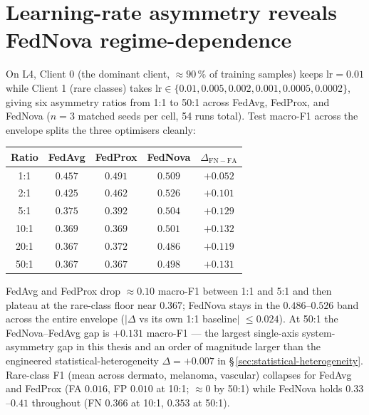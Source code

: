 \documentclass[11pt,a4paper]{report}
\begin{document}


\section{Learning-rate asymmetry reveals FedNova regime-dependence}
\label{sec:lr-asymmetry}

On L4, Client 0 (the dominant client, $\approx 90\,\%$ of training samples)
keeps $\textrm{lr} = 0.01$ while Client 1 (rare classes) takes
$\textrm{lr} \in \{0.01, 0.005, 0.002, 0.001, 0.0005, 0.0002\}$, giving six
asymmetry ratios from 1:1 to 50:1 across FedAvg, FedProx, and FedNova
($n=3$ matched seeds per cell, 54 runs total). Test macro-F1 across the
envelope splits the three optimisers cleanly:

\begin{center}
\begin{tabular}{cccc|c}
\hline
Ratio & FedAvg & FedProx & FedNova & $\Delta_{\mathrm{FN-FA}}$ \\
\hline
 1:1  & $0.457$ & $0.491$ & $\mathbf{0.509}$ & $+0.052$ \\
 2:1  & $0.425$ & $0.462$ & $\mathbf{0.526}$ & $+0.101$ \\
 5:1  & $0.375$ & $0.392$ & $\mathbf{0.504}$ & $+0.129$ \\
10:1  & $0.369$ & $0.369$ & $\mathbf{0.501}$ & $+0.132$ \\
20:1  & $0.367$ & $0.372$ & $\mathbf{0.486}$ & $+0.119$ \\
50:1  & $0.367$ & $0.367$ & $\mathbf{0.498}$ & $\mathbf{+0.131}$ \\
\hline
\end{tabular}
\end{center}

FedAvg and FedProx drop $\approx 0.10$ macro-F1 between 1:1 and 5:1 and then
plateau at the rare-class floor near $0.367$; FedNova stays in the
$0.486$--$0.526$ band across the entire envelope ($|\Delta$ vs its own 1:1
baseline$|$ $\leq 0.024$). At 50:1 the FedNova--FedAvg gap is $+0.131$ macro-F1
--- the largest single-axis system-asymmetry gap in this thesis and an order
of magnitude larger than the engineered statistical-heterogeneity
$\Delta = +0.007$ in \S\,\ref{sec:statistical-heterogeneity}. Rare-class F1
(mean across dermato, melanoma, vascular) collapses for FedAvg and FedProx
(FA $0.016$, FP $0.010$ at 10:1; $\approx 0$ by 50:1) while FedNova holds
$0.33$--$0.41$ throughout (FN $0.366$ at 10:1, $0.353$ at 50:1).
\end{document}
